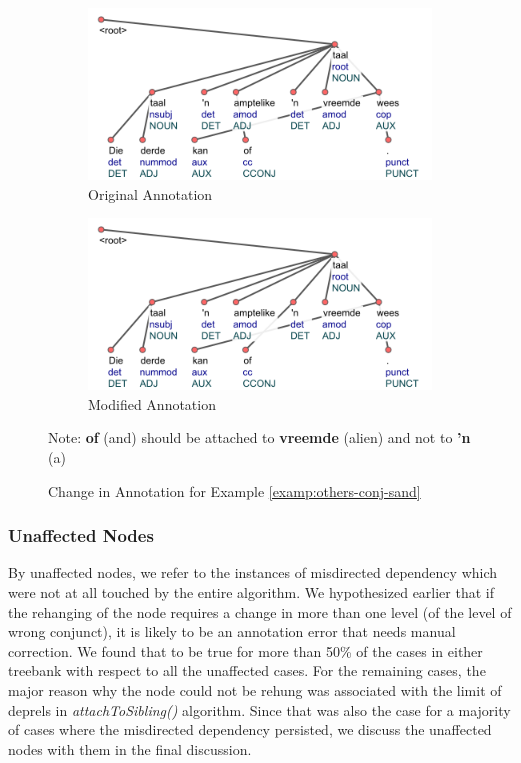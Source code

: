 \begin{figure}[H]
    \begin{subfigure}{\textwidth}
    \centering
    \includegraphics[scale=0.90]{img/others-conj-sand-1.png}
    \caption{Original Annotation}
    \label{fig:others-conj-sand-1}
    \end{subfigure}
    \begin{subfigure}{\textwidth}
    \centering
    \includegraphics[scale=0.90]{img/others-conj-sand-2.png}
    \caption{Modified Annotation}
    \label{fig:others-conj-sand-2}
    \end{subfigure}
    \caption{Change in Annotation for Example \ref{examp:others-conj-sand}}
    Note: \textbf{of} (and) should be attached to \textbf{vreemde} (alien) and not to \textbf{'n} (a)\\
    \label{fig:others-conj-sand}
\end{figure}

\subsubsection{Unaffected Nodes}

By unaffected nodes, we refer to the instances of misdirected dependency which were not at all touched by the entire algorithm. We hypothesized earlier that if the rehanging of the node requires a change in more than one level (of the level of wrong conjunct), it is likely to be an annotation error that needs manual correction. We found that to be true for more than 50\% of the cases in either treebank with respect to all the unaffected cases. For the remaining cases, the major reason why the node could not be rehung was associated with the limit of deprels in \textit{attachToSibling()} algorithm. Since that was also the case for a majority of cases where the misdirected dependency persisted, we discuss the unaffected nodes with them in the final discussion.

